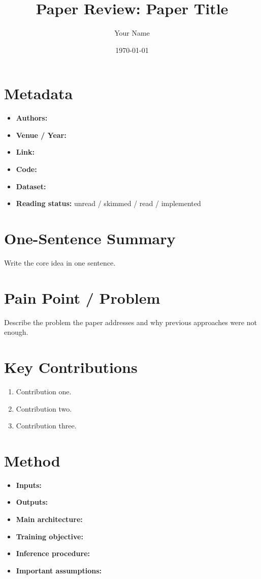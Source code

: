 \documentclass[11pt]{article}
\title{Paper Review: Paper Title}
\author{Your Name}
\date{\today}
\begin{document}
\maketitle

\section*{Metadata}

\begin{itemize}
  \item \textbf{Authors:}
  \item \textbf{Venue / Year:}
  \item \textbf{Link:}
  \item \textbf{Code:}
  \item \textbf{Dataset:}
  \item \textbf{Reading status:} unread / skimmed / read / implemented
\end{itemize}

\section*{One-Sentence Summary}

Write the core idea in one sentence.

\section*{Pain Point / Problem}

Describe the problem the paper addresses and why previous approaches were not enough.

\section*{Key Contributions}

\begin{enumerate}
  \item Contribution one.
  \item Contribution two.
  \item Contribution three.
\end{enumerate}

\section*{Method}

\begin{itemize}
  \item \textbf{Inputs:}
  \item \textbf{Outputs:}
  \item \textbf{Main architecture:}
  \item \textbf{Training objective:}
  \item \textbf{Inference procedure:}
  \item \textbf{Important assumptions:}
\end{itemize}
\end{document}
